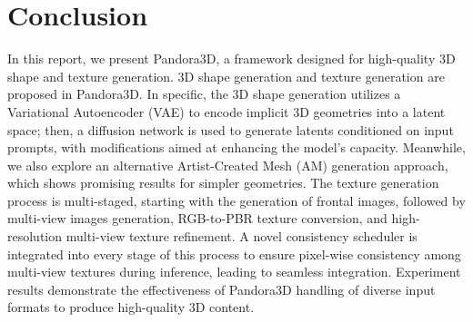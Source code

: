 \section{Conclusion}

In this report, we present Pandora3D, a framework designed for high-quality 3D shape and texture generation. 3D shape generation and texture generation are proposed in Pandora3D. In specific, the 3D shape generation utilizes a Variational Autoencoder (VAE) to encode implicit 3D geometries into a latent space; then, a diffusion network is used to generate latents conditioned on input prompts, with modifications aimed at enhancing the model's capacity. Meanwhile, we also explore an alternative Artist-Created Mesh (AM) generation approach, which shows promising results for simpler geometries. The texture generation process is multi-staged, starting with the generation of frontal images, followed by multi-view images generation, RGB-to-PBR texture conversion, and high-resolution multi-view texture refinement. A novel consistency scheduler is integrated into every stage of this process to ensure pixel-wise consistency among multi-view textures during inference, leading to seamless integration. Experiment results demonstrate the effectiveness of Pandora3D handling of diverse input formats to produce high-quality 3D content. 